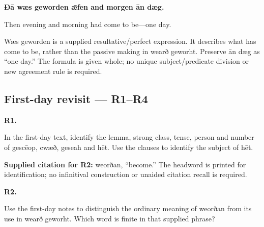 \textbf{Ðā wæs geworden ǣfen and morgen ān dæg.}

Then evening and morning had come to be—one day.

Wæs geworden is a supplied resultative/\allowbreak{}perfect expression. It describes what has come to be, rather than the passive making in wearð geworht. Preserve ān dæg as “one day.” The formula is given whole; no unique subject/\allowbreak{}predicate division or new agreement rule is required.

\subsection*{First-day revisit — R1–R4}

\par\begin{minipage}{\linewidth}\raggedright
\textbf{R1.}

In the first-day text, identify the lemma, strong class, tense, person and number of gescēop, cwæð, geseah and hēt. Use the clauses to identify the subject of hēt.

\end{minipage}\par\addvspace{4pt}

\textbf{Supplied citation for R2:} weorðan, “become.” The headword is printed for identification; no infinitival construction or unaided citation recall is required.

\par\begin{minipage}{\linewidth}\raggedright
\textbf{R2.}

Use the first-day notes to distinguish the ordinary meaning of weorðan from its use in wearð geworht. Which word is finite in that supplied phrase?

\end{minipage}\par\addvspace{4pt}

